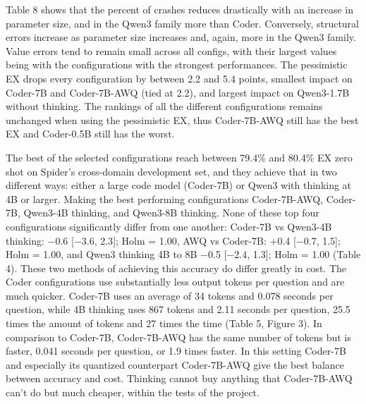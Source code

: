 Table 8 shows that the percent of crashes reduces drastically with an increase in parameter size, and in the Qwen3 family more than Coder. Conversely, structural errors increase as parameter size increases and, again, more in the Qwen3 family. Value errors tend to remain small across all configs, with their largest values being with the configurations with the strongest performances. The pessimistic EX drops every configuration by between 2.2 and 5.4 points, smallest impact on Coder-7B and Coder-7B-AWQ (tied at 2.2), and largest impact on Qwen3-1.7B without thinking. The rankings of all the different configurations remains unchanged when using the pessimistic EX, thus Coder-7B-AWQ still has the best EX and Coder-0.5B still has the worst.

The best of the selected configurations reach between 79.4\% and 80.4\% EX zero shot on Spider's cross-domain development set, and they achieve that in two different ways: either a large code model (Coder-7B) or Qwen3 with thinking at 4B or larger. Making the best performing configurations Coder-7B-AWQ, Coder-7B, Qwen3-4B thinking, and Qwen3-8B thinking. None of these top four configurations significantly differ from one another: Coder-7B vs Qwen3-4B thinking: −0.6 {[}−3.6, 2.3{]}; Holm = 1.00, AWQ vs Coder-7B: +0.4 {[}−0.7, 1.5{]}; Holm = 1.00, and Qwen3 thinking 4B to 8B −0.5 {[}−2.4, 1.3{]}; Holm = 1.00 (Table 4). These two methods of achieving this accuracy do differ greatly in cost. The Coder configurations use substantially less output tokens per question and are much quicker. Coder-7B uses an average of 34 tokens and 0.078 seconds per question, while 4B thinking uses 867 tokens and 2.11 seconds per question, 25.5 times the amount of tokens and 27 times the time (Table 5, Figure 3). In comparison to Coder-7B, Coder-7B-AWQ has the same number of tokens but is faster, 0.041 seconds per question, or 1.9 times faster. In this setting Coder-7B and especially its quantized counterpart Coder-7B-AWQ give the best balance between accuracy and cost. Thinking cannot buy anything that Coder-7B-AWQ can't do but much cheaper, within the tests of the project.

